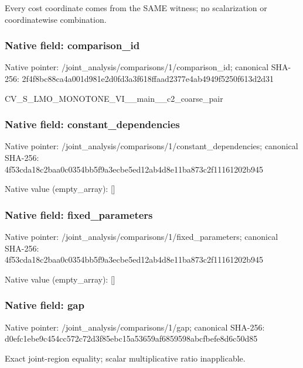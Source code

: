 \documentclass[10pt,a4paper]{article}
\begin{document}
\begingroup\raggedright\sloppy Every cost coordinate comes from the SAME witness;\allowbreak{} no scalarization or coordinatewise combination.\par\endgroup

\subsubsection{Native field: comparison\_\allowbreak{}id}
Native pointer: /joint\_\allowbreak{}analysis/comparisons/1/comparison\_\allowbreak{}id; canonical SHA-256: 2f4f8bc88ca4a001d981e2d0fd3a3f618ffaad2377e4ab4949f5250f613d2d31

\begingroup\raggedright\sloppy CV\_\allowbreak{}S\_\allowbreak{}LMO\_\allowbreak{}MONOTONE\_\allowbreak{}VI\_\allowbreak{}\_\allowbreak{}main\_\allowbreak{}\_\allowbreak{}c2\_\allowbreak{}coarse\_\allowbreak{}pair\par\endgroup

\subsubsection{Native field: constant\_\allowbreak{}dependencies}
Native pointer: /joint\_\allowbreak{}analysis/comparisons/1/constant\_\allowbreak{}dependencies; canonical SHA-256: 4f53cda18c2baa0c0354bb5f9a3ecbe5ed12ab4d8e11ba873c2f11161202b945

Native value (empty\_\allowbreak{}array): []

\subsubsection{Native field: fixed\_\allowbreak{}parameters}
Native pointer: /joint\_\allowbreak{}analysis/comparisons/1/fixed\_\allowbreak{}parameters; canonical SHA-256: 4f53cda18c2baa0c0354bb5f9a3ecbe5ed12ab4d8e11ba873c2f11161202b945

Native value (empty\_\allowbreak{}array): []

\subsubsection{Native field: gap}
Native pointer: /joint\_\allowbreak{}analysis/comparisons/1/gap; canonical SHA-256: d0efc1ebe9c454cc572c72d3f85ebc15a53659af6859598abcfbefe8d6c50d85

\begingroup\raggedright\sloppy Exact joint-region equality;\allowbreak{} scalar multiplicative ratio inapplicable.\par\endgroup
\end{document}
